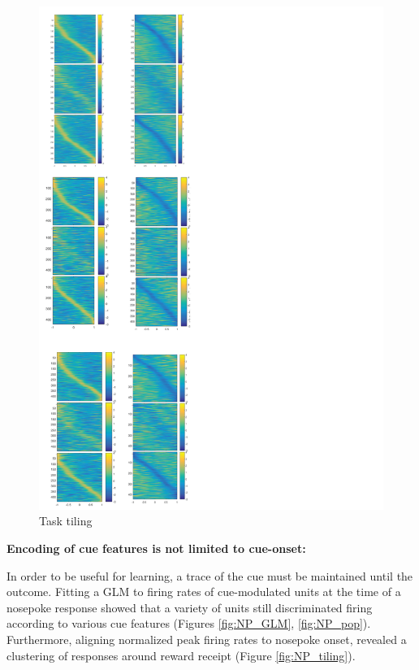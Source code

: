 \documentclass[11pt]{article}
\begin{document}
\begin{figure}[h]
\centering
\includegraphics[width=\textwidth]{Fig 8 - Task tiling.png}
\caption{Task tiling}
\label{fig:tiling}
\end{figure}
 
{\bf Encoding of cue features is not limited to cue-onset:}

In order to be useful for learning, a trace of the cue must be maintained until the outcome. Fitting a GLM to firing rates of cue-modulated units at the time of a nosepoke response showed that a variety of units still discriminated firing according to various cue features (Figures \ref{fig:NP_GLM}, \ref{fig:NP_pop}). Furthermore, aligning normalized peak firing rates to nosepoke onset, revealed a clustering of responses around reward receipt (Figure \ref{fig:NP_tiling}).
\end{document}
